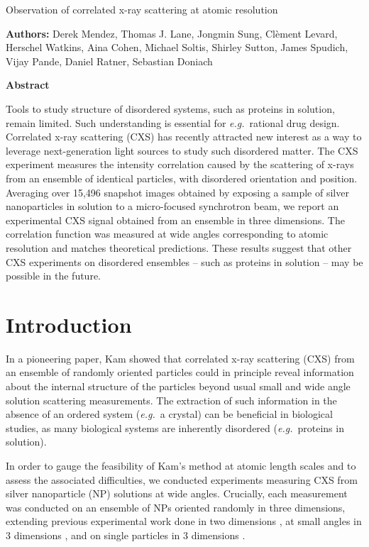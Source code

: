 \documentclass [11pt,fleqn]{article}
\def \hfb {\hfill\break}
\begin{document}
 
\hspace{1cm}{\bf Title:} Observation of correlated x-ray scattering at atomic resolution \hfb
 
{\bf Authors:} Derek Mendez, Thomas J. Lane, Jongmin Sung,  Cl\`ement Levard, Herschel Watkins, Aina Cohen, Michael Soltis, Shirley Sutton, James Spudich, Vijay Pande,  Daniel Ratner, Sebastian Doniach

{\bf Abstract}

Tools to study structure of disordered systems, such as proteins in solution, remain limited. Such understanding is essential for \emph{e.g.}~rational drug design. Correlated x-ray scattering (CXS) has recently attracted new interest as a way to leverage next-generation light sources to study such disordered matter. The CXS experiment measures the intensity correlation caused by the scattering of x-rays from an ensemble of identical particles, with disordered orientation and position. Averaging over 15,496 snapshot images obtained by exposing a sample of silver nanoparticles in solution to a micro-focused synchrotron beam, we report an experimental CXS signal obtained from an ensemble in three dimensions. The correlation function was measured at  wide angles corresponding to atomic resolution and matches theoretical predictions. These results suggest that other CXS experiments on disordered ensembles -- such as proteins in solution -- may be possible in the future.


\section{Introduction}

In a pioneering paper, Kam \cite{Kam:1977wc} showed that correlated x-ray scattering (CXS) from an ensemble of randomly oriented particles could in principle reveal information about the internal structure of the particles beyond usual small and wide angle solution scattering measurements. The extraction of such information in the absence of an ordered system (\textit{e.g.}~a crystal) can be beneficial in biological studies, as many biological systems are inherently disordered (\textit{e.g.}~proteins in solution).

In order to gauge the feasibility of Kam's method at atomic length scales and to assess the associated difficulties, we conducted experiments measuring CXS from silver nanoparticle (NP) solutions at wide angles. Crucially, each measurement was conducted on an ensemble of NPs oriented randomly in three dimensions, extending previous experimental work done in two dimensions \cite{Saldin:2011ch}, at small angles in 3 dimensions \cite{Kam:1981ua, Wochner:2009ia}, and on single particles in 3 dimensions \cite{Kam:1985tz, Starodub:1fy}. 
\end{document}
